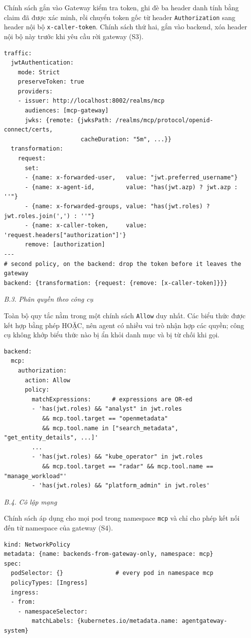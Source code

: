 Chính sách gắn vào Gateway kiểm tra token, ghi đè ba header danh tính bằng claim đã được xác minh, rồi chuyển token gốc từ header \texttt{Authorization} sang header nội bộ \texttt{x-caller-token}. Chính sách thứ hai, gắn vào backend, xóa header nội bộ này trước khi yêu cầu rời gateway (S3).
\begin{lstlisting}
traffic:
  jwtAuthentication:
    mode: Strict
    preserveToken: true
    providers:
    - issuer: http://localhost:8002/realms/mcp
      audiences: [mcp-gateway]
      jwks: {remote: {jwksPath: /realms/mcp/protocol/openid-connect/certs,
                      cacheDuration: "5m", ...}}
  transformation:
    request:
      set:
      - {name: x-forwarded-user,   value: "jwt.preferred_username"}
      - {name: x-agent-id,         value: "has(jwt.azp) ? jwt.azp : ''"}
      - {name: x-forwarded-groups, value: "has(jwt.roles) ? jwt.roles.join(',') : ''"}
      - {name: x-caller-token,     value: 'request.headers["authorization"]'}
      remove: [authorization]
---
# second policy, on the backend: drop the token before it leaves the gateway
backend: {transformation: {request: {remove: [x-caller-token]}}}
\end{lstlisting}
\textit{B.3. Phân quyền theo công cụ}

Toàn bộ quy tắc nằm trong một chính sách \texttt{Allow} duy nhất. Các biểu thức được kết hợp bằng phép HOẶC, nên agent có nhiều vai trò nhận hợp các quyền; công cụ không khớp biểu thức nào bị ẩn khỏi danh mục và bị từ chối khi gọi.
\begin{lstlisting}
backend:
  mcp:
    authorization:
      action: Allow
      policy:
        matchExpressions:      # expressions are OR-ed
        - 'has(jwt.roles) && "analyst" in jwt.roles
           && mcp.tool.target == "openmetadata"
           && mcp.tool.name in ["search_metadata", "get_entity_details", ...]'
        ...
        - 'has(jwt.roles) && "kube_operator" in jwt.roles
           && mcp.tool.target == "radar" && mcp.tool.name == "manage_workload"'
        - 'has(jwt.roles) && "platform_admin" in jwt.roles'
\end{lstlisting}
\textit{B.4. Cô lập mạng}

Chính sách áp dụng cho mọi pod trong namespace \texttt{mcp} và chỉ cho phép kết nối đến từ namespace của gateway (S4).
\begin{lstlisting}
kind: NetworkPolicy
metadata: {name: backends-from-gateway-only, namespace: mcp}
spec:
  podSelector: {}               # every pod in namespace mcp
  policyTypes: [Ingress]
  ingress:
  - from:
    - namespaceSelector:
        matchLabels: {kubernetes.io/metadata.name: agentgateway-system}
\end{lstlisting}

